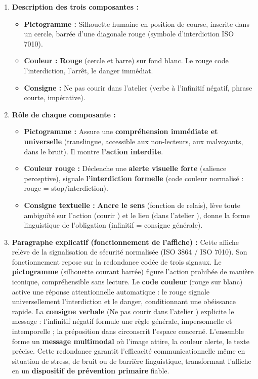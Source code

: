 \documentclass[11pt]{article}
\begin{document}
\begin{corrige}
\begin{enumerate}
\item \textbf{Description des trois composantes :}
\begin{itemize}
\item \textbf{Pictogramme :} Silhouette humaine en position de course, inscrite dans un cercle, barrée d'une diagonale rouge (symbole d'interdiction ISO 7010).
\item \textbf{Couleur :} \textbf{Rouge} (cercle et barre) sur fond blanc. Le rouge code l'interdiction, l'arrêt, le danger immédiat.
\item \textbf{Consigne :} \og Ne pas courir dans l'atelier \fg (verbe à l'infinitif négatif, phrase courte, impérative).
\end{itemize}
\item \textbf{Rôle de chaque composante :}
\begin{itemize}
\item \textbf{Pictogramme :} Assure une \textbf{compréhension immédiate et universelle} (translingue, accessible aux non-lecteurs, aux malvoyants, dans le bruit). Il montre \textbf{l'action interdite}.
\item \textbf{Couleur rouge :} Déclenche une \textbf{alerte visuelle forte} (salience perceptive), signale \textbf{l'interdiction formelle} (code couleur normalisé : rouge = stop/interdiction).
\item \textbf{Consigne textuelle :} \textbf{Ancre le sens} (fonction de relais), lève toute ambiguïté sur l'action (\og courir \fg) et le lieu (\og dans l'atelier \fg), donne la forme linguistique de l'obligation (infinitif = consigne générale).
\end{itemize}
\item \textbf{Paragraphe explicatif (fonctionnement de l'affiche) :}
Cette affiche relève de la signalisation de sécurité normalisée (ISO 3864 / ISO 7010). Son fonctionnement repose sur la redondance codée de trois signaux. Le \textbf{pictogramme} (silhouette courant barrée) figure l'action prohibée de manière iconique, compréhensible sans lecture. Le \textbf{code couleur} (rouge sur blanc) active une réponse attentionnelle automatique : le rouge signale universellement l'interdiction et le danger, conditionnant une obéissance rapide. La \textbf{consigne verbale} (\og Ne pas courir dans l'atelier \fg) explicite le message : l'infinitif négatif formule une règle générale, impersonnelle et intemporelle ; la préposition \og dans \fg circonscrit l'espace concerné. L'ensemble forme un \textbf{message multimodal} où l'image attire, la couleur alerte, le texte précise. Cette redondance garantit l'efficacité communicationnelle même en situation de stress, de bruit ou de barrière linguistique, transformant l'affiche en un \textbf{dispositif de prévention primaire} fiable.
\end{enumerate}
\end{corrige}
\end{document}
